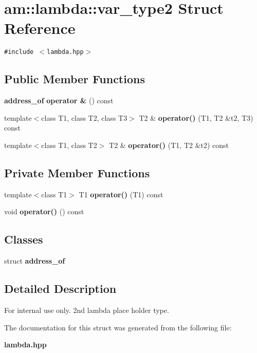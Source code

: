 \section{am::lambda::var\_\-type2 Struct Reference}
\label{structam_1_1lambda_1_1var__type2}
{\tt \#include $<$lambda.hpp$>$}

\subsection*{Public Member Functions}
\begin{CompactItemize}
\item 
{\bf address\_\-of} \textbf{operator \&} () const\label{structam_1_1lambda_1_1var__type2_e7fd2044c8ff27cca60e67190c7f9f85}

\item 
template$<$class T1, class T2, class T3$>$ T2 \& \textbf{operator()} (T1, T2 \&t2, T3) const \label{structam_1_1lambda_1_1var__type2_35e555861fad0cfd5175395351d919b1}

\item 
template$<$class T1, class T2$>$ T2 \& \textbf{operator()} (T1, T2 \&t2) const\label{structam_1_1lambda_1_1var__type2_bf4ee948158be0c7d229d1769c488f1b}

\end{CompactItemize}
\subsection*{Private Member Functions}
\begin{CompactItemize}
\item 
template$<$class T1$>$ T1 \textbf{operator()} (T1) const\label{structam_1_1lambda_1_1var__type2_b2a146d22913d79e8fa2642ff3920e28}

\item 
void \textbf{operator()} () const\label{structam_1_1lambda_1_1var__type2_d91f2a4f7c04d193a26355f8e20f83c1}

\end{CompactItemize}
\subsection*{Classes}
\begin{CompactItemize}
\item 
struct {\bf address\_\-of}
\end{CompactItemize}


\subsection{Detailed Description}
\begin{Desc}
\item[For internal use only.]
2nd lambda place holder type. \end{Desc}




The documentation for this struct was generated from the following file:\begin{CompactItemize}
\item 
{\bf lambda.hpp}\end{CompactItemize}
